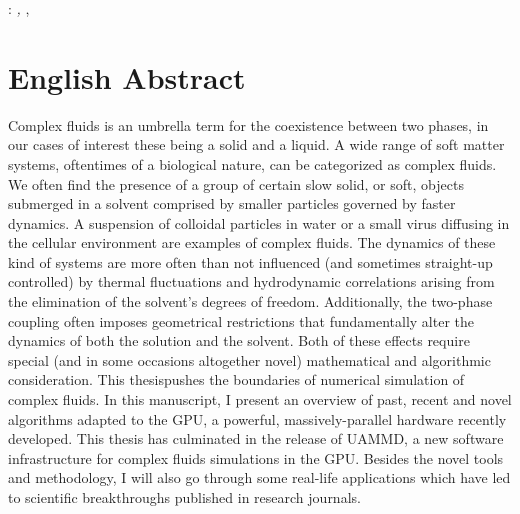 \documentclass[ twoside,openright,titlepage,numbers=noenddot,%
headinclude,footinclude,cleardoublepage=empty,abstract=on,
BCOR=5mm,paper=a4,fontsize=11pt, dvipsnames
]{scrreprt}
\begin{document}

\thispagestyle{empty}

\hfill

\vfill

\noindent\myName: \textit{\myTitle,} \mySubtitle, %
\textcopyright\ \myTime

\cleardoublepage
\cleardoublepage
\begingroup
\let\cleardoublepage\relax
\let\cleardoublepage\relax
\let\cleardoublepage\relax

\chapter*{English Abstract}

Complex fluids is an umbrella term for the coexistence between two phases, in our cases of interest these being a solid and a liquid. A wide range of soft matter systems, oftentimes of a biological nature, can be categorized as complex fluids. We often find the presence of a group of certain slow solid, or soft, objects submerged in a solvent comprised by smaller particles governed by faster dynamics. A suspension of colloidal particles in water or a small virus diffusing in the cellular environment are examples of complex fluids. The dynamics of these kind of systems are more often than not influenced (and sometimes straight-up controlled) by thermal fluctuations and hydrodynamic correlations arising from the elimination of the solvent's degrees of freedom. Additionally, the two-phase coupling often imposes geometrical restrictions that fundamentally alter the dynamics of both the solution and the solvent. Both of these effects require special (and in some occasions altogether novel) mathematical and algorithmic consideration. This thesispushes the boundaries of numerical simulation of complex fluids. In this manuscript, I present an overview of past, recent and novel algorithms adapted to the GPU, a powerful, massively-parallel hardware recently developed. This thesis has culminated in the release of UAMMD, a new software infrastructure for complex fluids simulations in the GPU. Besides the novel tools and methodology, I will also go through some real-life applications which have led to scientific breakthroughs published in research journals.
\end{document}
